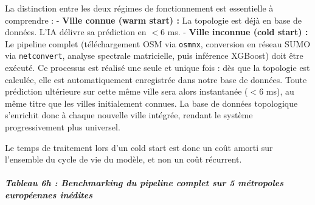\documentclass[10pt, a4paper]{article}
\begin{document}
La distinction entre les deux régimes de fonctionnement est essentielle
à comprendre : - \textbf{Ville connue (warm start) :} La topologie est
déjà en base de données. L'IA délivre sa prédiction en \(< 6\) ms. -
\textbf{Ville inconnue (cold start) :} Le pipeline complet
(téléchargement OSM via \texttt{osmnx}, conversion en réseau SUMO via
\texttt{netconvert}, analyse spectrale matricielle, puis inférence
XGBoost) doit être exécuté. Ce processus est réalisé une seule et unique
fois : dès que la topologie est calculée, elle est automatiquement
enregistrée dans notre base de données. Toute prédiction ultérieure sur
cette même ville sera alors instantanée (\(< 6\) ms), au même titre que
les villes initialement connues. La base de données topologique
s'enrichit donc à chaque nouvelle ville intégrée, rendant le système
progressivement plus universel.

Le temps de traitement lors d'un cold start est donc un coût amorti sur
l'ensemble du cycle de vie du modèle, et non un coût récurrent.

\subparagraph{Tableau 6h : Benchmarking du pipeline complet sur 5
métropoles européennes
inédites}\label{tableau-6h-benchmarking-du-pipeline-complet-sur-5-muxe9tropoles-europuxe9ennes-inuxe9dites}
\end{document}
